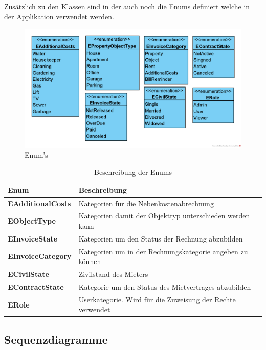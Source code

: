 \newpage
Zusätzlich zu den Klassen sind in der  auch noch die Enums definiert welche in der Applikation verwendet werden.

\begin{figure}[H]
  \begin{center}
    \includegraphics[width=0.65\linewidth]{content/diagrams/out/classdiagram/Enums.png}
    \caption{Enum's}
    \label{enums}
  \end{center}
\end{figure}

\begin{table}[H]
  \centering
  \settowidth{}
  \setlength\extrarowheight{2pt}
    \begin{tabulary}{1.0\textwidth}{|L|L|}
      \hline
      \textbf{Enum}& \textbf{Beschreibung}\\
    \hline
    \textbf{EAdditionalCosts} & Kategorien für die Nebenkostenabrechnung\\
    \hline
    \textbf{EObjectType} & Kategorien damit der Objekttyp unterschieden werden kann\\
    \hline
    \textbf{EInvoiceState} & Kategorien um den Status der Rechnung abzubilden\\
    \hline
    \textbf{EInvoiceCategory} & Kategorien um in der Rechnungskategorie angeben zu können\\
    \hline
    \textbf{ECivilState} & Zivilstand des Mieters\\
    \hline
    \textbf{EContractState} & Kategorie um den Status des Mietvertrages abzubilden\\
    \hline
    \textbf{ERole} & Userkategorie. Wird für die Zuweisung der Rechte verwendet\\
    \hline
\end{tabulary}
\caption{Beschreibung der Enums}
\end{table}

\newpage
\subsection{Sequenzdiagramme}


